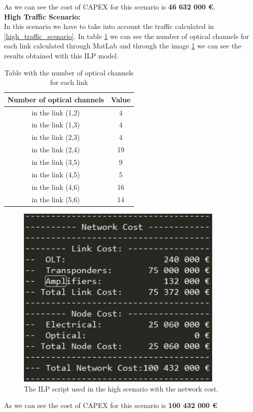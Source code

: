 As we can see the cost of CAPEX for this scenario is \textbf{46 632 000 \euro}.\\

\newpage
\textbf{High Traffic Scenario:}\\

In this scenario we have to take into account the traffic calculated in \ref{high_traffic_scenario}. In table \ref{result_ILP3_reference} we can see the number of optical channels for each link calculated through MatLab and through the image \ref{scriptopaque_surv_ref_high} we can see the results obtained with this ILP model.\\

\begin{table}[h!]
\centering
\begin{tabular}{|| c | c||}
 \hline
 Number of optical channels & Value \\
 \hline\hline
 in the link (1,2) & 4 \\
 in the link (1,3) & 4 \\
 in the link (2,3) & 4 \\
 in the link (2,4) & 19 \\
 in the link (3,5) & 9 \\
 in the link (4,5) & 5 \\
 in the link (4,6) & 16 \\
 in the link (5,6) & 14 \\
 \hline
\end{tabular}
\caption{Table with the number of optical channels for each link}
\label{result_ILP3_reference}
\end{table}


\begin{figure}[h!]
\centering
\includegraphics[width=10cm]{sdf/ilp/figures/script_opaque_surv_ref_high}
\caption{The ILP script used in the high scenario with the network cost.}
\label{scriptopaque_surv_ref_high}
\end{figure}

As we can see the cost of CAPEX for this scenario is \textbf{100 432 000 \euro}\\
